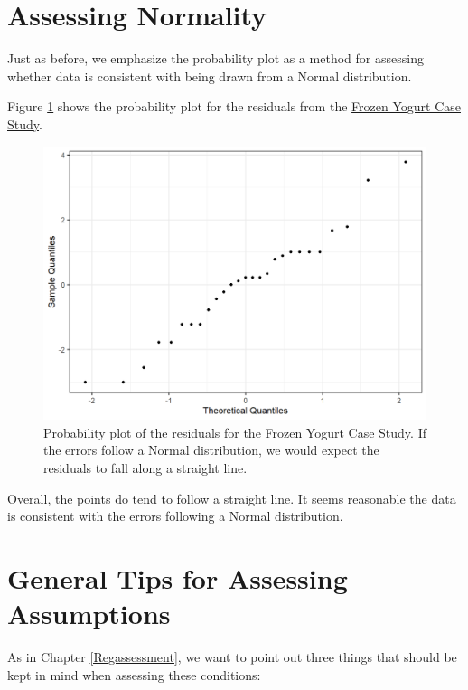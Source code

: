 \documentclass[
]{book}
\theoremstyle{plain}
\theoremstyle{mydefn}
\theoremstyle{myexmpl}
\theoremstyle{remark}
\begin{document}
\hypertarget{assessing-normality-2}{%
\section{Assessing Normality}\label{assessing-normality-2}}

Just as before, we emphasize the probability plot as a method for assessing whether data is consistent with being drawn from a Normal distribution.

Figure \ref{fig:blockassessment-normal-yogurt} shows the probability plot for the residuals from the \protect\hyperlink{CaseYogurt}{Frozen Yogurt Case Study}.

\begin{figure}

{\centering \includegraphics[width=0.8\linewidth]{./Images/blockassessment-normal-yogurt-1} 

}

\caption{Probability plot of the residuals for the Frozen Yogurt Case Study.  If the errors follow a Normal distribution, we would expect the residuals to fall along a straight line.}\label{fig:blockassessment-normal-yogurt}
\end{figure}

Overall, the points do tend to follow a straight line. It seems reasonable the data is consistent with the errors following a Normal distribution.

\hypertarget{general-tips-for-assessing-assumptions-2}{%
\section{General Tips for Assessing Assumptions}\label{general-tips-for-assessing-assumptions-2}}

As in Chapter \ref{Regassessment}, we want to point out three things that should be kept in mind when assessing these conditions:
\end{document}
